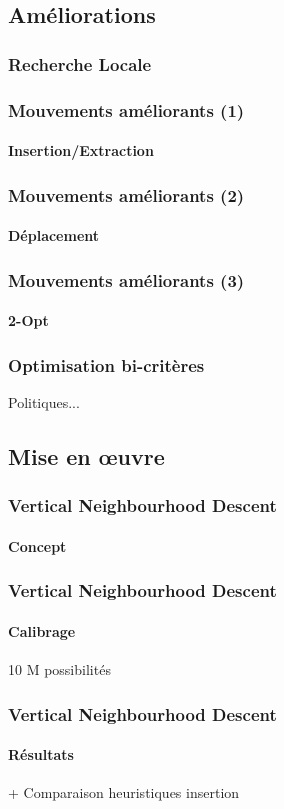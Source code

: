 \subsection{Améliorations}
\begin{frame}
	\frametitle{Recherche Locale}
\end{frame}
\begin{frame}
	\frametitle{Mouvements améliorants (1)}
	\framesubtitle{Insertion/Extraction}
\end{frame}
\begin{frame}
	\frametitle{Mouvements améliorants (2)}
	\framesubtitle{Déplacement}
\end{frame}
\begin{frame}
	\frametitle{Mouvements améliorants (3)}
	\framesubtitle{2-Opt}
\end{frame}
\begin{frame}
	\frametitle{Optimisation bi-critères}
	Politiques...
\end{frame}

\subsection{Mise en \oe uvre}
\begin{frame}
	\frametitle{Vertical Neighbourhood Descent}
	\framesubtitle{Concept}
\end{frame}
\begin{frame}
	\frametitle{Vertical Neighbourhood Descent}
	\framesubtitle{Calibrage}
	10 M possibilités
\end{frame}
\begin{frame}
	\frametitle{Vertical Neighbourhood Descent}
	\framesubtitle{Résultats}
	+ Comparaison heuristiques insertion
\end{frame}
